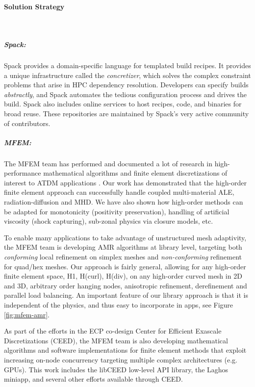 \paragraph{Solution Strategy} \leavevmode \\

\subparagraph{Spack:}
Spack provides a domain-specific language for templated build recipes.
It provides a unique infrastructure called the {\it concretizer}, which
solves the complex constraint problems that arise in HPC dependency
resolution.  Developers can specify builds {\it abstractly}, and Spack
automates the tedious configuration process and drives the build. Spack
also includes online services to host recipes, code, and binaries for
broad reuse.  These repositories are maintained by Spack's very active
community of contributors.

\subparagraph{MFEM:}
The MFEM team has performed and documented a lot of research in
high-performance mathematical algorithms and finite element discretizations
of interest to ATDM applications
\cite{BLAST18,BLASTFCT18,BLASTFCT17,BLAST16,BLAST14,BLAST13,BLAST12,BLAST11}.
Our work has demonstrated that the high-order finite element approach can
successfully handle coupled multi-material ALE, radiation-diffusion and MHD.
We have also shown how high-order methods can be adapted for monotonicity
(positivity preservation), handling of artificial viscosity (shock capturing),
sub-zonal physics via closure models, etc.

To enable many applications to take advantage of unstructured mesh adaptivity,
the MFEM team is developing AMR algorithms at library level, targeting both
{\em conforming} local refinement on simplex meshes and {\em non-conforming}
refinement for quad/hex meshes. Our approach is fairly general, allowing for
any high-order finite element space, H1, H(curl), H(div), on any high-order
curved mesh in 2D and 3D, arbitrary order hanging nodes, anisotropic refinement,
derefinement and parallel load balancing.
An important feature of our library approach is that it is independent of
the physics, and thus easy to incorporate in apps, see Figure \ref{fig:mfem-amr}.

As part of the efforts in the ECP co-design Center for Efficient Exascale
Discretizations (CEED), the MFEM team is also developing mathematical algorithms
and software implementations for finite element methods that exploit increasing
on-node concurrency targeting multiple complex architectures (e.g. GPUs). This
work includes the libCEED low-level API library, the Laghos miniapp, and several
other efforts available through CEED.

